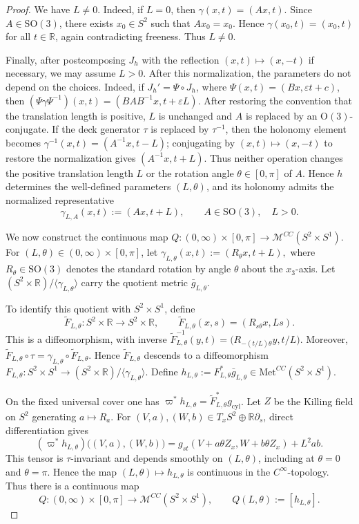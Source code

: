 \documentclass[10pt,a4paper]{amsart}
\begin{document}
\begin{proof}
We have \(L\neq 0\). Indeed, if \(L=0\), then $\gamma(x,t)=(Ax,t).$
Since \(A\in \mathrm{SO}(3)\), there exists \(x_0\in S^2\) such that \(Ax_0=x_0\). Hence
$\gamma(x_0,t)=(x_0,t)$ for all $t\in \mathbb R$, again contradicting freeness. Thus \(L\neq 0\).

Finally, after postcomposing $J_h$ with the reflection
$(x,t)\mapsto(x,-t)$ if necessary, we may assume $L>0$. After this
normalization, the parameters do not depend on the choices. Indeed, if
$J_h'=\Psi\circ J_h$, where
$\Psi(x,t)=(Bx,\varepsilon t+c)$, then
\((\Psi\gamma\Psi^{-1})(x,t)
=(BAB^{-1}x,t+\varepsilon L)\).
After restoring the convention that the translation length is positive,
$L$ is unchanged and $A$ is replaced by an $\mathrm O(3)$-conjugate. If the
deck generator $\tau$ is replaced by $\tau^{-1}$, then the holonomy element becomes
$\gamma^{-1}(x,t)=(A^{-1}x,t-L)$; conjugating by $(x,t)\mapsto(x,-t)$ to
restore the normalization gives $(A^{-1}x,t+L)$. Thus neither operation
changes the positive translation length $L$ or the rotation angle
$\theta\in[0,\pi]$ of $A$. Hence
$h$ determines the well-defined parameters $(L,\theta)$, and its holonomy
admits the normalized representative
\[
\gamma_{L,A}(x,t):=(Ax,t+L),
\qquad
A\in \mathrm{SO}(3),\quad L>0.
\]

We now construct the continuous map
$Q\colon (0,\infty) \times [0,\pi] \to \mathcal{M}^{CC}(S^2 \times S^1)$.
For \((L,\theta)\in (0,\infty)\times[0,\pi]\), let
\(
\gamma_{L,\theta}(x,t):=(R_\theta x,t+L),
\)
where \(R_\theta\in\mathrm{SO}(3)\) denotes the standard rotation by angle \(\theta\) about the \(x_3\)-axis. Let
$(S^2\times \mathbb R)/\langle \gamma_{L,\theta}\rangle$
carry the quotient metric \(\bar g_{L,\theta}\).

To identify this quotient with \(S^2\times S^1\), define
\[
\widetilde F_{L,\theta}\colon S^2\times \mathbb R\longrightarrow S^2\times \mathbb R,
\qquad
\widetilde F_{L,\theta}(x,s)=(R_{s\theta}x,Ls).
\]
This is a diffeomorphism, with inverse
\(\widetilde F_{L,\theta}^{-1}(y,t)=\bigl(R_{-(t/L)\theta}y,t/L\bigr)\).
Moreover,
\(\widetilde F_{L,\theta}\circ \tau=\gamma_{L,\theta}\circ \widetilde F_{L,\theta}\).
Hence \(\widetilde F_{L,\theta}\) descends to a diffeomorphism
\(F_{L,\theta}\colon S^2\times S^1\to
(S^2\times \mathbb R)/\langle \gamma_{L,\theta}\rangle\).
Define
\(h_{L,\theta}:=F_{L,\theta}^*\bar g_{L,\theta}\in \mathrm{Met}^{CC}(S^2\times S^1)\).

On the fixed universal cover one has
\(\varpi^*h_{L,\theta}=\widetilde F_{L,\theta}^*g_{\mathrm{cyl}}\).
Let $Z$ be the Killing field on $S^2$ generating $a\mapsto R_a$. For
$(V,a),(W,b)\in T_xS^2\oplus\mathbb R\partial_s$, direct differentiation
gives
\[
(\varpi^*h_{L,\theta})\bigl((V,a),(W,b)\bigr)
=g_{st}(V+a\theta Z_x,W+b\theta Z_x)+L^2ab.
\]
This tensor is $\tau$-invariant and depends smoothly on $(L,\theta)$,
including at $\theta=0$ and $\theta=\pi$. Hence the map
$(L,\theta)\longmapsto h_{L,\theta}$
is continuous in the \(C^\infty\)-topology. Thus there is a continuous map
\[
Q\colon(0,\infty)\times[0,\pi]\longrightarrow \mathcal{M}^{CC}(S^2\times S^1),
\qquad
Q(L,\theta):=[h_{L,\theta}].
\]



\end{proof}
\end{document}
